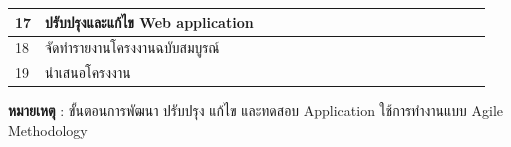 \documentclass[12pt,oneside,openright,a4paper]{cpe-thai-project}
\begin{document}
\begin{table}[h]
{\begin{tabular}{|llllllllllllllllll|}
\multicolumn{1}{|l|}{17}                    & \multicolumn{1}{l|}{ปรับปรุงและแก้ไข Web application}                                     & \multicolumn{1}{l|}{\cellcolor[HTML]{2D8C9F}} & \multicolumn{1}{l|}{\cellcolor[HTML]{2D8C9F}} & \multicolumn{1}{l|}{\cellcolor[HTML]{2D8C9F}} & \multicolumn{1}{l|}{\cellcolor[HTML]{2D8C9F}} & \multicolumn{1}{l|}{\cellcolor[HTML]{2D8C9F}} & \multicolumn{1}{l|}{\cellcolor[HTML]{2D8C9F}} & \multicolumn{1}{l|}{\cellcolor[HTML]{2D8C9F}} & \multicolumn{1}{l|}{\cellcolor[HTML]{2D8C9F}} & \multicolumn{1}{l|}{\cellcolor[HTML]{2D8C9F}} & \multicolumn{1}{l|}{\cellcolor[HTML]{2D8C9F}} & \multicolumn{1}{l|}{\cellcolor[HTML]{2D8C9F}} & \multicolumn{1}{l|}{\cellcolor[HTML]{2D8C9F}} & \multicolumn{1}{l|}{\cellcolor[HTML]{2D8C9F}} & \multicolumn{1}{l|}{\cellcolor[HTML]{2D8C9F}} & \multicolumn{1}{l|}{\cellcolor[HTML]{2D8C9F}} & \cellcolor[HTML]{2D8C9F} \\ \hline
\multicolumn{1}{|l|}{18}                    & \multicolumn{1}{l|}{จัดทำรายงานโครงงานฉบับสมบูรณ์}                                       & \multicolumn{1}{l|}{}                         & \multicolumn{1}{l|}{}                         & \multicolumn{1}{l|}{}                         & \multicolumn{1}{l|}{}                         & \multicolumn{1}{l|}{}                         & \multicolumn{1}{l|}{}                         & \multicolumn{1}{l|}{}                         & \multicolumn{1}{l|}{}                         & \multicolumn{1}{l|}{\cellcolor[HTML]{2D8C9F}} & \multicolumn{1}{l|}{\cellcolor[HTML]{2D8C9F}} & \multicolumn{1}{l|}{\cellcolor[HTML]{2D8C9F}} & \multicolumn{1}{l|}{\cellcolor[HTML]{2D8C9F}} & \multicolumn{1}{l|}{\cellcolor[HTML]{2D8C9F}} & \multicolumn{1}{l|}{\cellcolor[HTML]{2D8C9F}} & \multicolumn{1}{l|}{\cellcolor[HTML]{2D8C9F}} & \cellcolor[HTML]{2D8C9F} \\ \hline
\multicolumn{1}{|l|}{19}                    & \multicolumn{1}{l|}{นำเสนอโครงงาน}                                                        & \multicolumn{1}{l|}{}                         & \multicolumn{1}{l|}{}                         & \multicolumn{1}{l|}{}                         & \multicolumn{1}{l|}{}                         & \multicolumn{1}{l|}{}                         & \multicolumn{1}{l|}{}                         & \multicolumn{1}{l|}{}                         & \multicolumn{1}{l|}{}                         & \multicolumn{1}{l|}{}                         & \multicolumn{1}{l|}{}                         & \multicolumn{1}{l|}{}                         & \multicolumn{1}{l|}{}                         & \multicolumn{1}{l|}{}                         & \multicolumn{1}{l|}{}                         & \multicolumn{1}{l|}{}                         & \cellcolor[HTML]{2D8C9F} \\ \hline
\end{tabular}
}
\end{table}
\FloatBarrier
\textbf{หมายเหตุ} : ขั้นตอนการพัฒนา ปรับปรุง แก้ไข และทดสอบ Application ใช้การทำงานแบบ Agile Methodology
\clearpage
\end{document}
